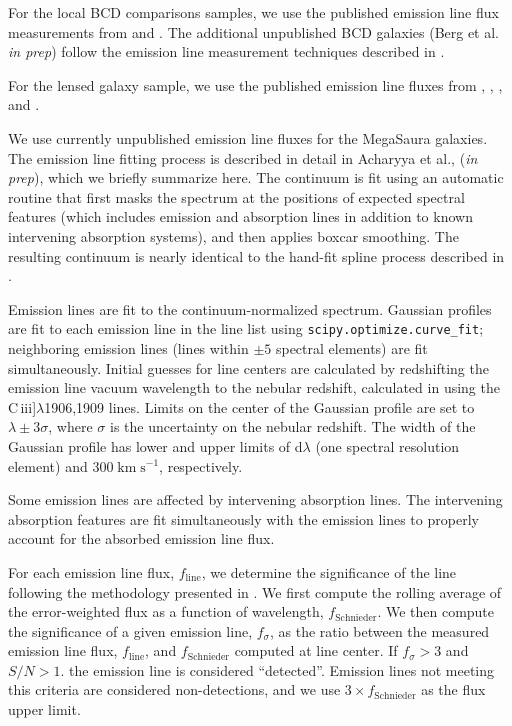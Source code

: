 \documentclass[preprint2]{aastex62}
\newcommand{\ciii}{C\,{\sc iii}]\xspace}
\newcommand{\kms}{\ensuremath{\;\mathrm{km}\;\mathrm{s}^{-1}}\xspace}
\newcommand{\mage}{{\sc Meg}a{\sc S}a{\sc ura}\xspace}
\begin{document}
For the local BCD comparisons samples, we use the published emission line flux measurements from \citet{Berg+2016} and \citet{Senchyna+2017}. The additional unpublished BCD galaxies (Berg et al. \emph{in prep}) follow the emission line measurement techniques described in \citet{Berg+2016}.

For the lensed galaxy sample, we use the published emission line fluxes from \citet{Erb+2010}, \citet{Christensen+2012}, \citet{Stark+2014}, and \citet{Berg+2018}.

We use currently unpublished emission line fluxes for the \mage galaxies. The emission line fitting process is described in detail in Acharyya et al., (\emph{in prep}), which we briefly summarize here. The continuum is fit using an automatic routine that first masks the spectrum at the positions of expected spectral features (which includes emission and absorption lines in addition to known intervening absorption systems), and then applies boxcar smoothing. The resulting continuum is nearly identical to the hand-fit spline process described in \citet{Rigby+2018a}. 

Emission lines are fit to the continuum-normalized spectrum. Gaussian profiles are fit to each emission line in the line list using {\tt scipy.optimize.curve\_fit}; neighboring emission lines (lines within $\pm 5$ spectral elements) are fit simultaneously. Initial guesses for line centers are calculated by redshifting the emission line vacuum wavelength to the nebular redshift, calculated in \citet{Rigby+2018a} using the \ciii$\lambda$1906,1909 lines. Limits on the center of the Gaussian profile are set to $\lambda \pm 3\sigma$, where $\sigma$ is the uncertainty on the nebular redshift. The width of the Gaussian profile has lower and upper limits of d$\lambda$ (one spectral resolution element) and 300\kms, respectively.

Some emission lines are affected by intervening absorption lines. The intervening absorption features are fit simultaneously with the emission lines to properly account for the absorbed emission line flux.

For each emission line flux, $f_{\mathrm{line}}$, we determine the significance of the line following the methodology presented in \citet{Schnieider+1993}. We first compute the rolling average of the error-weighted flux as a function of wavelength, $f_{\mathrm{Schnieder}}$. We then compute the significance of a given emission line, $f_{\sigma}$, as the ratio between the measured emission line flux, $f_{\mathrm{line}}$, and $f_{\mathrm{Schnieder}}$ computed at line center. If $f_{\sigma}>3$ and $S/N > 1$. the emission line is considered ``detected''. Emission lines not meeting this criteria are considered non-detections, and we use $3\times f_{\mathrm{Schnieder}}$ as the flux upper limit.
\end{document}
